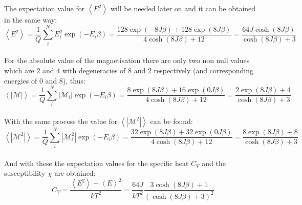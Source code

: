 \documentclass[11pt,a4paper,oneside]{article}
\begin{document}
		The expectation value for $\left<E^2\right>$ will be needed later on and it can be obtained in the same way:\\
		
		\begin{equation*}\left<E^2\right>=\frac{1}{Q}\sum_i^N{E_i^2\exp{\left(-E_i\beta\right)}}=\frac{128\exp{\left(-8J\beta\right)}+128\exp{\left(8J\beta\right)}}{4\cosh{\left(8J\beta\right)}+12}=\frac{64J\cosh{\left(8J\beta\right)}}{\cosh{\left(8J\beta\right)}+3}\end{equation*}\\
		
		For the absolute value of the magnetisation there are only two non null values which are $2$ and $4$ with degeneracies of $8$ and $2$ respectively (and corresponding energies of $0$ and $8$), thus:\\
		
		\begin{equation*}\left<\left|\mathcal{M}\right|\right>=\frac{1}{Q}\sum_i^N{\left|\mathcal{M}_i\right|\exp{\left(-E_i\beta\right)}}=\frac{8\exp{\left(8J\beta\right)}+16\exp{\left(0J\beta\right)}}{4\cosh{\left(8J\beta\right)}+12}=\frac{2\exp{\left(8J\beta\right)}+4}{\cosh{\left(8J\beta\right)}+3}\end{equation*}\\
		
		With the same process the value for $\left<\left|\mathcal{M}^2\right|\right>$ can be found:\\
		
		\begin{equation*}\left<\left|\mathcal{M}^2\right|\right>=\frac{1}{Q}\sum_i^N{\left|\mathcal{M}_i^2\right|\exp{\left(-E_i\beta\right)}}=\frac{32\exp{\left(8J\beta\right)}+32\exp{\left(0J\beta\right)}}{4\cosh{\left(8J\beta\right)}+12}=\frac{8\exp{\left(8J\beta\right)}+8}{\cosh{\left(8J\beta\right)}+3}\end{equation*}\\
		
		And with these the expectation values for the specific heat $C_V$ and the susceptibility $\chi$ are obtained:\\
		
		\begin{equation*}C_V=\frac{\left<E^2\right>-\left<E\right>^2}{kT^2}=\frac{64J}{kT^2}\frac{3\cosh{\left(8J\beta\right)}+1}{\left(\cosh{\left(8J\beta\right)}+3\right)^2}\end{equation*}\\
		
\end{document}
